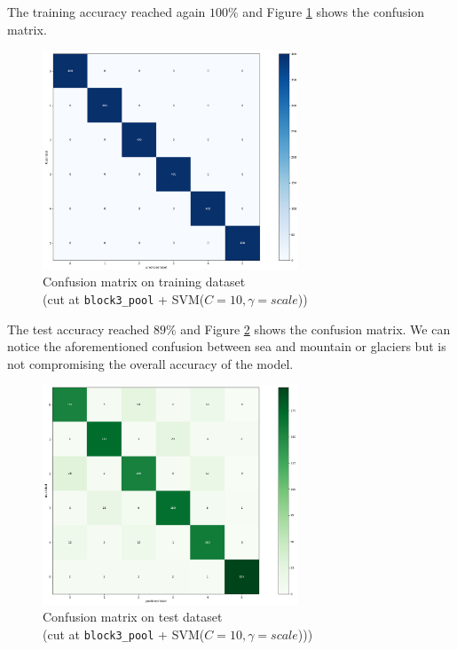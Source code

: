 \documentclass[compsoc]{IEEEtran}
\begin{document}
The training accuracy reached again $100\%$ and Figure \ref{fig:cm3-train} shows the confusion matrix. 


\begin{figure}[ht!]
\centering                                                                        
\includegraphics[width=3in]{../images/cm3-train.png}
\captionsetup{justification=centering}                                                                                         
\caption{Confusion matrix on training dataset \\ (cut at \texttt{block3\_pool} + SVM($C=10, \gamma=scale$))}
\label{fig:cm3-train}                                                                                                                               
\end{figure}

The test accuracy reached $89\%$ and Figure \ref{fig:cm3-test} shows the confusion matrix. We can notice the aforementioned confusion between sea and mountain or glaciers but is not compromising the overall accuracy of the model.


\begin{figure}[ht!]
\centering                                                                        
\includegraphics[width=3in]{../images/cm3-test.png}
\captionsetup{justification=centering}                                                                                         
\caption{Confusion matrix on test dataset \\ (cut at \texttt{block3\_pool} + SVM($C=10, \gamma=scale$)))}
\label{fig:cm3-test}                                                                                                                               
\end{figure}
\end{document}
